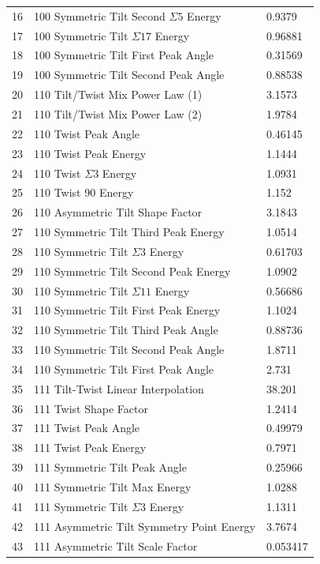 \documentclass[12pt]{report}
\begin{document}
\begin{longtable}{r l l}
16 & \textlangle{}100\textrangle{} Symmetric Tilt Second $\Sigma5$ Energy & 0.9379 \\
17 & \textlangle{}100\textrangle{} Symmetric Tilt $\Sigma17$ Energy & 0.96881 \\
18 & \textlangle{}100\textrangle{} Symmetric Tilt First Peak Angle & 0.31569 \\
19 & \textlangle{}100\textrangle{} Symmetric Tilt Second Peak Angle & 0.88538 \\
20 & \textlangle{}110\textrangle{} Tilt/Twist Mix Power Law (1) & 3.1573 \\
21 & \textlangle{}110\textrangle{} Tilt/Twist Mix Power Law (2) & 1.9784 \\
22 & \textlangle{}110\textrangle{} Twist Peak Angle & 0.46145 \\
23 & \textlangle{}110\textrangle{} Twist Peak Energy & 1.1444 \\
24 & \textlangle{}110\textrangle{} Twist $\Sigma3$ Energy & 1.0931 \\
25 & \textlangle{}110\textrangle{} Twist 90\textdegree{} Energy & 1.152 \\
26 & \textlangle{}110\textrangle{} Asymmetric Tilt Shape Factor & 3.1843 \\
27 & \textlangle{}110\textrangle{} Symmetric Tilt Third Peak Energy & 1.0514 \\
28 & \textlangle{}110\textrangle{} Symmetric Tilt $\Sigma3$ Energy & 0.61703 \\
29 & \textlangle{}110\textrangle{} Symmetric Tilt Second Peak Energy & 1.0902 \\
30 & \textlangle{}110\textrangle{} Symmetric Tilt $\Sigma11$ Energy & 0.56686 \\
31 & \textlangle{}110\textrangle{} Symmetric Tilt First Peak Energy & 1.1024 \\
32 & \textlangle{}110\textrangle{} Symmetric Tilt Third Peak Angle & 0.88736 \\
33 & \textlangle{}110\textrangle{} Symmetric Tilt Second Peak Angle & 1.8711 \\
34 & \textlangle{}110\textrangle{} Symmetric Tilt First Peak Angle & 2.731 \\
35 & \textlangle{}111\textrangle{} Tilt-Twist Linear Interpolation & 38.201 \\
36 & \textlangle{}111\textrangle{} Twist Shape Factor & 1.2414 \\
37 & \textlangle{}111\textrangle{} Twist Peak Angle & 0.49979 \\
38 & \textlangle{}111\textrangle{} Twist Peak Energy & 0.7971 \\
39 & \textlangle{}111\textrangle{} Symmetric Tilt Peak Angle & 0.25966 \\
40 & \textlangle{}111\textrangle{} Symmetric Tilt Max Energy & 1.0288 \\
41 & \textlangle{}111\textrangle{} Symmetric Tilt $\Sigma3$ Energy & 1.1311 \\
42 & \textlangle{}111\textrangle{} Asymmetric Tilt Symmetry Point Energy & 3.7674 \\
43 & \textlangle{}111\textrangle{} Asymmetric Tilt Scale Factor & 0.053417 \\
\end{longtable}
\end{document}
